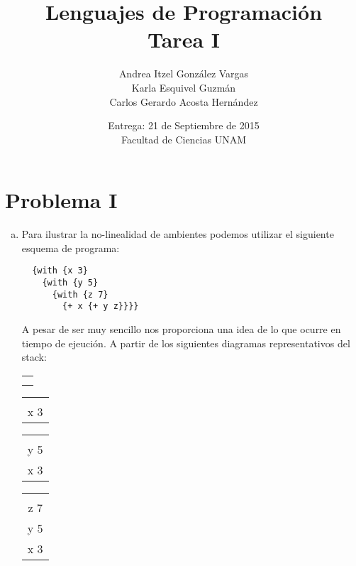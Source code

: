 \documentclass[12pt]{article}
\title{Lenguajes de Programación \\ Tarea I}
\author{Andrea Itzel González Vargas \\ Karla Esquivel Guzmán \\ Carlos Gerardo Acosta Hernández}
\date{Entrega: 21 de Septiembre de 2015 \\ Facultad de Ciencias UNAM}
\begin{document}
\maketitle
\section{Problema I}
\begin{enumerate}[a)]
\item \indent Para ilustrar la no-linealidad de ambientes podemos utilizar el siguiente esquema de programa:
\begin{verbatim}
  {with {x 3}
    {with {y 5}
      {with {z 7}
        {+ x {+ y z}}}}
\end{verbatim}
A pesar de ser muy sencillo nos proporciona una idea de lo que ocurre en tiempo de ejeución. A partir de los siguientes diagramas representativos
del stack:\par
\begin{table}[ht]
  \centering
  \begin{minipage}{.10\linewidth}
    \begin{tabular}{|c|}
      \hline \\ [-2.5 ex]
         \\ [0 ex]
      \hline
    \end{tabular}
  \end{minipage}%
  \begin{minipage}{.15\linewidth}
    \begin{tabular}{|c|}
      \hline \\ [-2.5 ex]    
      x 3 \\ [0 ex]
      \hline 
    \end{tabular}
  \end{minipage}%
  \begin{minipage}{.15\linewidth}
    \begin{tabular}{|c|}
      \hline \\ [-2.5 ex]
      y 5 \\ [0 ex]
      \hline
      x 3 \\ [0 ex]
      \hline
    \end{tabular}
  \end{minipage}%
  \begin{minipage}{.15\linewidth}
    \begin{tabular}{|c|}
      \hline \\ [-2.5 ex]
      z 7 \\ [0 ex]
      \hline
      y 5 \\ [0 ex]
      \hline
      x 3 \\ [0 ex]
      \hline
    \end{tabular}
  \end{minipage}
\end{table}


\end{enumerate}
\end{document}
